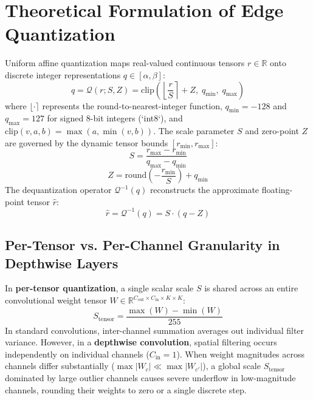 \documentclass[11pt,a4paper]{article}
\begin{document}
\section{Theoretical Formulation of Edge Quantization}

Uniform affine quantization maps real-valued continuous tensors $r \in \mathbb{R}$ onto discrete integer representations $q \in [\alpha, \beta]$:
\begin{equation}
q = \mathcal{Q}(r; S, Z) = \text{clip}\left(\left\lfloor \frac{r}{S} \right\rceil + Z, \; q_{\min}, \; q_{\max}\right)
\end{equation}
where $\lfloor \cdot \rceil$ represents the round-to-nearest-integer function, $q_{\min} = -128$ and $q_{\max} = 127$ for signed 8-bit integers (`int8`), and $\text{clip}(v, a, b) = \max(a, \min(v, b))$. The scale parameter $S$ and zero-point $Z$ are governed by the dynamic tensor bounds $[r_{\min}, r_{\max}]$:
\begin{equation}
S = \frac{r_{\max} - r_{\min}}{q_{\max} - q_{\min}}
\end{equation}
\begin{equation}
Z = \text{round}\left( - \frac{r_{\min}}{S} \right) + q_{\min}
\end{equation}
The dequantization operator $\mathcal{Q}^{-1}(q)$ reconstructs the approximate floating-point tensor $\hat{r}$:
\begin{equation}
\hat{r} = \mathcal{Q}^{-1}(q) = S \cdot (q - Z)
\end{equation}

\subsection{Per-Tensor vs. Per-Channel Granularity in Depthwise Layers}
In \textbf{per-tensor quantization}, a single scalar scale $S$ is shared across an entire convolutional weight tensor $W \in \mathbb{R}^{C_{\text{out}} \times C_{\text{in}} \times K \times K}$:
\begin{equation}
S_{\text{tensor}} = \frac{\max(W) - \min(W)}{255}
\end{equation}
In standard convolutions, inter-channel summation averages out individual filter variance. However, in a \textbf{depthwise convolution}, spatial filtering occurs independently on individual channels ($C_{\text{in}} = 1$). When weight magnitudes across channels differ substantially ($\max |W_c| \ll \max |W_{c'}|$), a global scale $S_{\text{tensor}}$ dominated by large outlier channels causes severe underflow in low-magnitude channels, rounding their weights to zero or a single discrete step.
\end{document}
